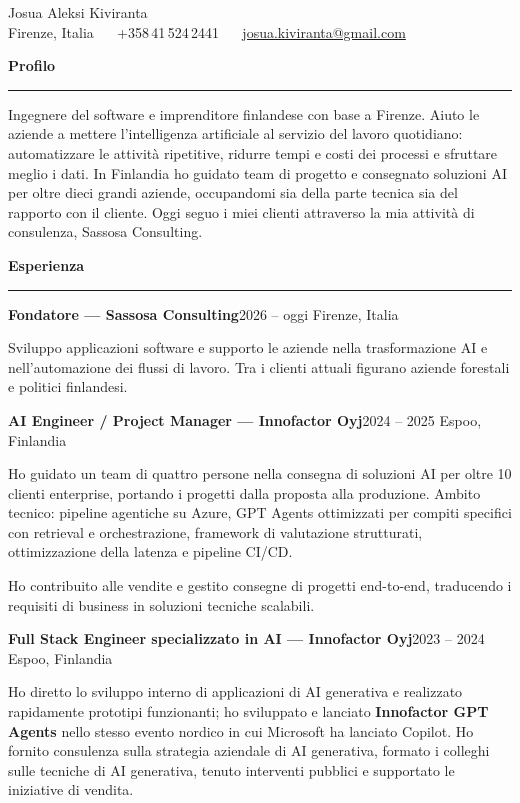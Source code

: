 \documentclass[10pt,a4paper]{article}
\newcommand{\cvsection}[1]{%
  \vspace{9pt}%
  {\textbf{#1}}\par
  \vspace{1.5pt}\hrule\vspace{5pt}}
\newcommand{\entry}[2]{%
  \needspace{3\baselineskip}%
  \vspace{4.5pt}%
  \textbf{#1}\hfill #2\par\nopagebreak\vspace{0.5pt}}
\begin{document}
\begin{center}
  {\LARGE Josua Aleksi Kiviranta}\\[5pt]
  Firenze, Italia \ \textperiodcentered{} \ +358\,41\,524\,2441 \ \textperiodcentered{} \ \href{mailto:josua.kiviranta@gmail.com}{josua.kiviranta@gmail.com}
\end{center}

\cvsection{Profilo}
Ingegnere del software e imprenditore finlandese con base a Firenze. Aiuto le aziende a mettere l'intelligenza artificiale al servizio del lavoro quotidiano: automatizzare le attività ripetitive, ridurre tempi e costi dei processi e sfruttare meglio i dati. In Finlandia ho guidato team di progetto e consegnato soluzioni AI per oltre dieci grandi aziende, occupandomi sia della parte tecnica sia del rapporto con il cliente. Oggi seguo i miei clienti attraverso la mia attività di consulenza, Sassosa Consulting.

\cvsection{Esperienza}

\entry{Fondatore --- Sassosa Consulting}{2026 -- oggi \textperiodcentered{} Firenze, Italia}
Sviluppo applicazioni software e supporto le aziende nella trasformazione AI e nell'automazione dei flussi di lavoro. Tra i clienti attuali figurano aziende forestali e politici finlandesi.

\entry{AI Engineer / Project Manager --- Innofactor Oyj}{2024 -- 2025 \textperiodcentered{} Espoo, Finlandia}
Ho guidato un team di quattro persone nella consegna di soluzioni AI per oltre 10 clienti enterprise, portando i progetti dalla proposta alla produzione. Ambito tecnico: pipeline agentiche su Azure, GPT Agents ottimizzati per compiti specifici con retrieval e orchestrazione, framework di valutazione strutturati, ottimizzazione della latenza e pipeline CI/CD.

Ho contribuito alle vendite e gestito consegne di progetti end-to-end, traducendo i requisiti di business in soluzioni tecniche scalabili.

\entry{Full Stack Engineer specializzato in AI --- Innofactor Oyj}{2023 -- 2024 \textperiodcentered{} Espoo, Finlandia}
Ho diretto lo sviluppo interno di applicazioni di AI generativa e realizzato rapidamente prototipi funzionanti; ho sviluppato e lanciato \textbf{Innofactor GPT Agents} nello stesso evento nordico in cui Microsoft ha lanciato Copilot. Ho fornito consulenza sulla strategia aziendale di AI generativa, formato i colleghi sulle tecniche di AI generativa, tenuto interventi pubblici e supportato le iniziative di vendita.
\end{document}
